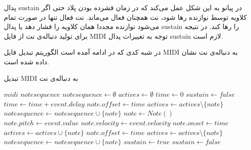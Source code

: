 پدال \gls{sustain} در پیانو به این شکل عمل می‌کند که در زمان فشرده بودن پلاد حتی
اگر کلاویه توسط نوازنده رها شود، نت همچنان فعال می‌ماند. نت فعال تنها در صورت
تمام می‌شود نوازنده مجددا همان کلاویه را فشار دهد یا پدال \gls{sustain} را رها
کند. در نتیجه برای تولید دنباله‌ی نت از فایل \gls{MIDI} توجه به تغییرات پدال
\gls{sustain} لازم است.

در شبه کدی که در ادامه آمده است الگوریتم تبدیل فایل \gls{MIDI} به دنباله‌ی نت
نشان داده شده است.

\begin{algorithm}
\caption{تبدیل \gls{MIDI} به دنباله‌ی نت}
\begin{algorithmic}
\begin{latin}
    \Require $midi$
    \Ensure $notesequence$
    \State $notesequence \leftarrow \emptyset$
    \State $actives \leftarrow \emptyset$
    \State $time \leftarrow 0$
    \State $sustain \leftarrow false$
        \State $time \leftarrow time + event.delay$
                        \State $note.offset \leftarrow time$
                        \State $actives \leftarrow actives \setminus \{note\}$
                        \State $notesequence \leftarrow notesequence \cup \{note\}$
                    \EndIf
                \EndFor
            \EndIf
            \State $note \leftarrow Note()$
            \State $note.pitch \leftarrow event.value$
            \State $note.velocity \leftarrow event.velocity$
            \State $note.onset \leftarrow time$
            \State $actives \leftarrow actives \cup \{note\}$
                    \State $note.offset \leftarrow time$
                        \State $actives \leftarrow actives \setminus \{note\}$
                        \State $notesequence \leftarrow notesequence \cup \{note\}$
                    \EndIf
                \EndIf
            \EndFor
            \State $sustain \leftarrow true$
            \State $sustain \leftarrow false$
\end{latin}
\end{algorithmic}
\end{algorithm}
